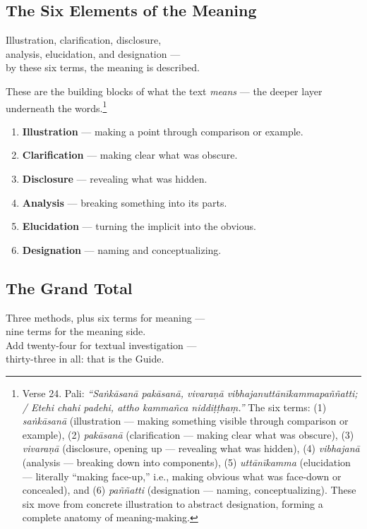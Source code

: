 \subsection*{The Six Elements of the Meaning}

\begin{versebox}
Illustration, clarification, disclosure,\\
analysis, elucidation, and designation ---\\
by these six terms, the meaning is described.
\end{versebox}

These are the building blocks of what the text \textit{means} --- the deeper layer underneath the words.\footnote{Verse 24. Pali: \textit{``Saṅkāsanā pakāsanā, vivaraṇā vibhajanuttānīkammapaññatti; / Etehi chahi padehi, attho kammañca niddiṭṭhaṃ.''} The six terms: (1) \textit{saṅkāsanā} (illustration --- making something visible through comparison or example), (2) \textit{pakāsanā} (clarification --- making clear what was obscure), (3) \textit{vivaraṇā} (disclosure, opening up --- revealing what was hidden), (4) \textit{vibhajanā} (analysis --- breaking down into components), (5) \textit{uttānīkamma} (elucidation --- literally ``making face-up,'' i.e., making obvious what was face-down or concealed), and (6) \textit{paññatti} (designation --- naming, conceptualizing). These six move from concrete illustration to abstract designation, forming a complete anatomy of meaning-making.}

\begin{enumerate}[itemsep=2pt]
\item \textbf{Illustration} --- making a point through comparison or example.
\item \textbf{Clarification} --- making clear what was obscure.
\item \textbf{Disclosure} --- revealing what was hidden.
\item \textbf{Analysis} --- breaking something into its parts.
\item \textbf{Elucidation} --- turning the implicit into the obvious.
\item \textbf{Designation} --- naming and conceptualizing.
\end{enumerate}

\subsection*{The Grand Total}

\begin{versebox}
Three methods, plus six terms for meaning ---\\
nine terms for the meaning side.\\
Add twenty-four for textual investigation ---\\
thirty-three in all: that is the Guide.
\end{versebox}

